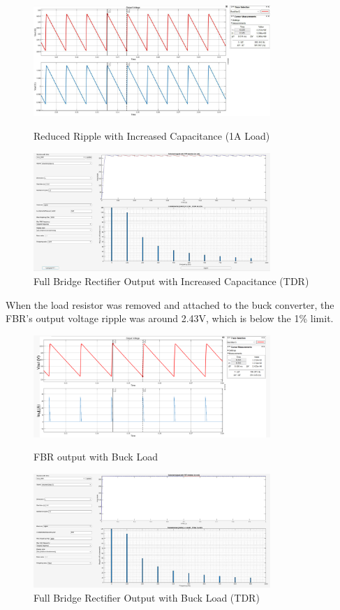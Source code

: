\documentclass[12pt]{article}
\begin{document}
\begin{figure}[h]
    \centering
    \includegraphics[width=0.8\textwidth]{img/1A.jpg}
    \caption{Reduced Ripple with Increased Capacitance (1A Load)}

    \centering
    \includegraphics[width=0.8\textwidth]{img/FBR_1A_n.jpg}
    \caption{Full Bridge Rectifier Output with Increased Capacitance (TDR)}
\end{figure}
\newpage

When the load resistor was removed and attached to the buck converter, the FBR's output voltage ripple was around 2.43V, which is below the 1\% limit.
\begin{figure}[h]
    \centering
    \includegraphics[width=0.8\textwidth]{img/FBR_Buck_graph.png}
    \caption{FBR output with Buck Load}
    \centering
    \includegraphics[width=0.8\textwidth]{img/FBR_Buck.jpg}
    \caption{Full Bridge Rectifier Output with Buck Load (TDR)}
\end{figure}
\end{document}
